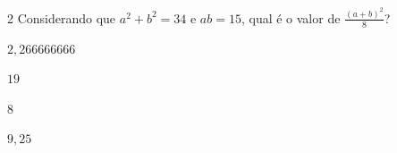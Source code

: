 










\num{2} Considerando que $a^2+ b^2 = 34$ e $ab= 15$, qual é o valor de
$\frac{(a + b)^2}{8}$?

\begin{escolha}[itemsep=0pt]
\item $2,266666666$
\item $19$
\item $8$
\item $9,25$
\end{escolha}












